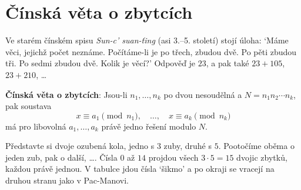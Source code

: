\section{Čínská věta o zbytcích}

Ve starém čínském spisu \textit{Sun-c' suan-ťing} (asi 3.--5. století) stojí úloha: `Máme věci, jejichž počet neznáme. Počítáme-li je po třech, zbudou dvě. Po pěti zbudou tři. Po sedmi zbudou dvě. Kolik je věcí?' Odpověď je $23$, a pak také $23 + 105$, $23 + 210$, \dots

\begin{definitionbox}
  \textbf{Čínská věta o zbytcích}: Jsou-li $n_1, \ldots, n_k$ po dvou nesoudělná a $N = n_1n_2\cdots n_k$, pak soustava
  \begin{equation*}
    x\equiv a_1\pmod{n_1},\quad\ldots,\quad x\equiv a_k\pmod{n_k}
  \end{equation*}
  má pro libovolná $a_1, \ldots, a_k$ právě jedno řešení modulo $N$.
\end{definitionbox}

Představte si dvoje ozubená kola, jedno s $3$ zuby, druhé s $5$. Pootočíme oběma o jeden zub, pak o další, \dots. Čísla $0$ až $14$ projdou všech $3\cdot 5 = 15$ dvojic zbytků, každou právě jednou. V tabulce jdou čísla `šikmo' a po okraji se vracejí na druhou stranu jako v Pac-Manovi.

\begin{center}
\end{center}

